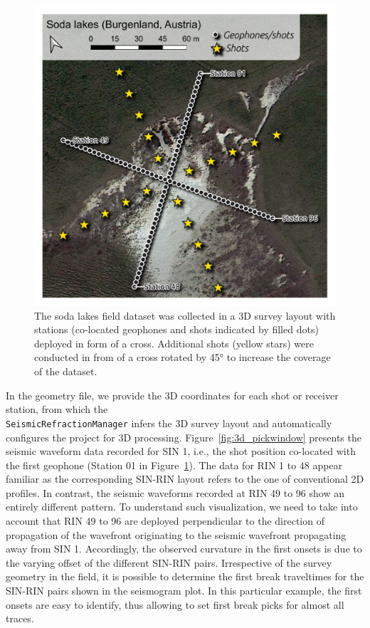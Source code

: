 \documentclass[a4paper,fleqn]{cas-sc}
\begin{document}
\begin{figure}
	\centering
	\includegraphics[width=.75\textwidth]{./figures/map_sodalakes.pdf}
	\caption{The soda lakes field dataset was collected in a 3D survey layout with stations (co-located geophones and shots indicated by filled dots) deployed in form of a cross. Additional shots (yellow stars) were conducted in from of a cross rotated by 45° to increase the coverage of the dataset.}
	\label{fig:map_sodalakes}
\end{figure}

In the geometry file, we provide the 3D coordinates for each shot or receiver station, from which the\\ \texttt{SeismicRefractionManager} infers the 3D survey layout and automatically configures the project for 3D processing. 
Figure~\ref{fig:3d_pickwindow} presents the seismic waveform data recorded for SIN 1, i.e., the shot position co-located with the first geophone (Station 01 in Figure~\ref{fig:map_sodalakes}). The data for RIN 1 to 48 appear familiar as the corresponding SIN-RIN layout refers to the one of conventional 2D profiles. In contrast, the seismic waveforms recorded at RIN 49 to 96 show an entirely different pattern. To understand such visualization, we need to take into account that RIN 49 to 96 are deployed perpendicular to the direction of propagation of the wavefront originating
to the seismic wavefront propagating away 
from SIN 1. Accordingly, the observed curvature in the first onsets is due to the varying offset of the different SIN-RIN pairs.
Irrespective of the survey geometry in the field, it is possible to determine the first break traveltimes for the SIN-RIN pairs shown in the seismogram plot. In this particular example, the first onsets are easy to identify, thus allowing to set first break picks for almost all traces. 
\end{document}
